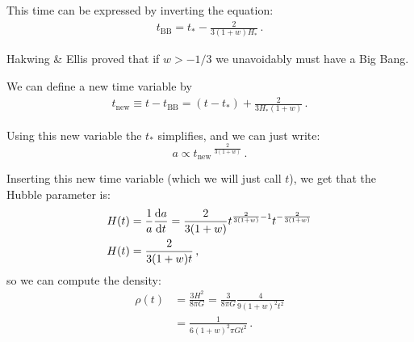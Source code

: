 \documentclass[main.tex]{subfiles}
\begin{document}
This time can be expressed by inverting the equation: 
%
\begin{align}
t _{\text{BB}} = t_{*} - \frac{2}{3 (1+w)H_{*}}
\,.
\end{align}

Hakwing \& Ellis proved that if \(w>-1/3\) we unavoidably must have a Big Bang.

We can define a new time variable by 
%
\begin{align}
t_{\text{new}} \equiv t-t _{\text{BB}} =  (t - t_{*}) 
+ \frac{2}{3 H_{*} (1+w)}
\,.
\end{align}

Using this new variable the \(t_{*}\) simplifies, and we can just write:
\begin{equation}
a \propto t_{\text{new}}\,^{\frac{2}{3(1+w)}}
\,.
\end{equation}

Inserting this new time variable (which we will just call \(t\)), we get that the Hubble parameter is:
\begin{align} 
H(t) &= \frac{1}{a} \dv{a}{t} = \frac{2}{3(1+w)} t^{\frac{2}{3(1+w)}-1} t^{- \frac{2}{3(1+w)}} \\
H(t) &=  \frac{2}{3(1+w) t} \label{eq:einstein-de-sitter-age}
\,,
\end{align}
so we can compute the density:
\begin{align}
\rho(t) &= \frac{3H^2}{8 \pi G} = \frac{3}{8 \pi G} \frac{4}{9 (1+w)^2 t^2} \\
&= \frac{1}{6 (1+w)^2 \pi G t^2}
\,.
\end{align}
\end{document}
